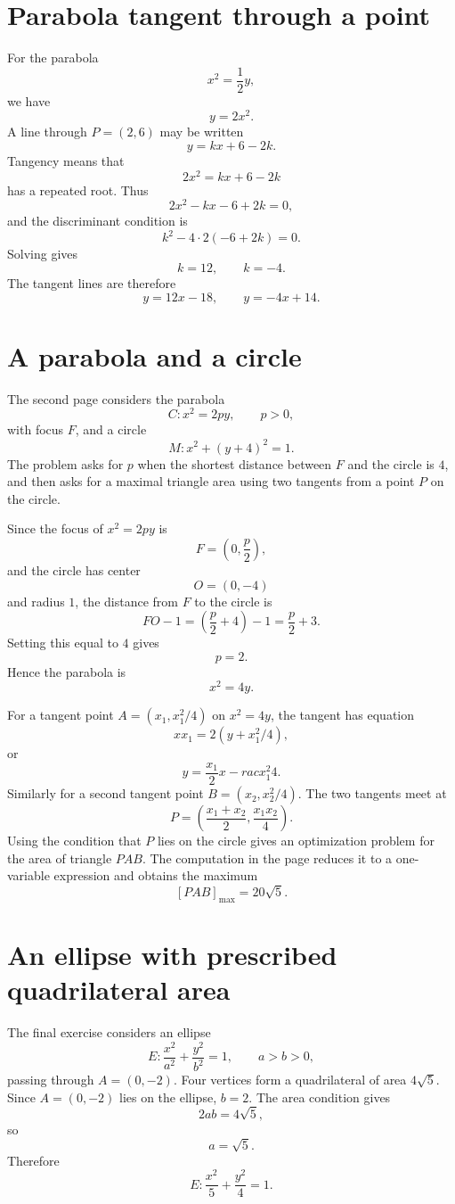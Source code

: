 \section{Parabola tangent through a point}

For the parabola
\[
  x^2=\frac12 y,
\]
we have
\[
  y=2x^2.
\]
A line through \(P=(2,6)\) may be written
\[
  y=kx+6-2k.
\]
Tangency means that
\[
  2x^2=kx+6-2k
\]
has a repeated root.  Thus
\[
  2x^2-kx-6+2k=0,
\]
and the discriminant condition is
\[
  k^2-4\cdot2(-6+2k)=0.
\]
Solving gives
\[
  k=12,\qquad k=-4.
\]
The tangent lines are therefore
\[
  y=12x-18,\qquad y=-4x+14.
\]

\section{A parabola and a circle}

The second page considers the parabola
\[
  C:x^2=2py,\qquad p>0,
\]
with focus \(F\), and a circle
\[
  M:x^2+(y+4)^2=1.
\]
The problem asks for \(p\) when the shortest distance between \(F\) and the circle is \(4\), and then asks for a maximal triangle area using two tangents from a point \(P\) on the circle.

Since the focus of \(x^2=2py\) is
\[
  F=\left(0,\frac p2\right),
\]
and the circle has center
\[
  O=(0,-4)
\]
and radius \(1\), the distance from \(F\) to the circle is
\[
  FO-1=\left(\frac p2+4\right)-1=\frac p2+3.
\]
Setting this equal to \(4\) gives
\[
  p=2.
\]
Hence the parabola is
\[
  x^2=4y.
\]

For a tangent point \(A=(x_1,x_1^2/4)\) on \(x^2=4y\), the tangent has equation
\[
  xx_1=2(y+x_1^2/4),
\]
or
\[
  y=\frac{x_1}{2}x-
rac{x_1^2}{4}.
\]
Similarly for a second tangent point \(B=(x_2,x_2^2/4)\).  The two tangents meet at
\[
  P=\left(\frac{x_1+x_2}{2},\frac{x_1x_2}{4}\right).
\]
Using the condition that \(P\) lies on the circle gives an optimization problem for the area of triangle \(PAB\).  The computation in the page reduces it to a one-variable expression and obtains the maximum
\[
  [PAB]_{\max}=20\sqrt5.
\]

\section{An ellipse with prescribed quadrilateral area}

The final exercise considers an ellipse
\[
  E:\frac{x^2}{a^2}+\frac{y^2}{b^2}=1,\qquad a>b>0,
\]
passing through \(A=(0,-2)\).  Four vertices form a quadrilateral of area \(4\sqrt5\).  Since \(A=(0,-2)\) lies on the ellipse, \(b=2\).  The area condition gives
\[
  2ab=4\sqrt5,
\]
so
\[
  a=\sqrt5.
\]
Therefore
\[
  E:\frac{x^2}{5}+\frac{y^2}{4}=1.
\]

